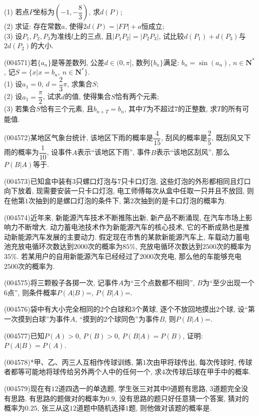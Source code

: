 (1) 若点$P$坐标为$(-1,-\dfrac 83)$, 求$d(P)$;\\
(2) 求证: 存在常数$a$, 使得$2d(P)=|FP|+a$恒成立;\\
(3) 设$P_1,P_2,P_3$为准线$l$上的三点, 且$|P_1P_2|=|P_2P_3|$, 试比较$d(P_1)+d(P_3)$与$2d(P_2)$的大小.
\item (004571)若$\{a_n\}$是等差数列, 公差$d\in (0,\pi]$, 数列$\{b_n\}$满足: $b_n=\sin (a_n)$, $n \in \mathbf{N}^*$, 记$S=\{x|x=b_n, \ n\in \mathbf{N}^*\}$.\\
(1) 设$a_1=0$, $d=\dfrac 23 \pi$, 求集合$S$;\\
(2) 设$a_1=\dfrac\pi 2$, 试求$d$的值, 使得集合$S$恰有两个元素;\\
(3) 若集合$S$恰有三个元素, 且$b_{n+T}=b_n$, 其中$T$为不超过$7$的正整数, 求$T$的所有可能值.
\item (004572)某地区气象台统计, 该地区下雨的概率是$\dfrac 4{15}$, 刮风的概率是$\dfrac 25$, 既刮风又下雨的概率为$\dfrac 1{10}$, 设事件$A$表示``该地区下雨'', 事件$B$表示``该地区刮风'', 那么$P(B|A)$等于.
\item (004573)已知盒中装有$3$只螺口灯泡与$7$只卡口灯泡, 这些灯泡的外形都相同且灯口向下放着, 现需要安装一只卡口灯泡, 电工师傅每次从盒中任取一只并且不放回, 则在他第$1$次抽到的是螺口灯泡的条件下, 第$2$次抽到的是卡口灯泡的概率为.
\item (004574)近年来, 新能源汽车技术不断推陈出新, 新产品不断涌现, 在汽车市场上影响力不断增大. 动力蓄电池技术作为新能源汽车的核心技术, 它的不断成熟也是推动新能源汽车发展的主要动力. 假定现在市售的某款新能源汽车上, 车载动力蓄电池充放电循环次数达到$2000$次的概率为$85\%$, 充放电循环次数达到$2500$次的概率为$35\%$. 若某用户的自用新能源汽车已经经过了$2000$次充电, 那么他的车能够充电$2500$次的概率为.
\item (004575)将三颗骰子各掷一次, 记事件$A$为``三个点数都不相同'', $B$为``至少出现一个$6$点'', 则条件概率$P(A|B)$=, $P(B|A)$=.
\item (004576)袋中有大小完全相同的$2$个白球和$3$个黄球, 逐个不放回地摸出$2$个球, 设``第一次摸到白球''为事件$A$, ``摸到的$2$个球同色''为事件$B$, 则$P(B|A)$=.
\item (004577)已知$P(A)>0$, $P(B)>0$, $P(B|A)=P(B)$, 证明: $P(A|B)=P(A)$.
\item (004578)*甲、乙、丙三人互相作传球训练, 第$1$次由甲将球传出, 每次传球时, 传球者都等可能地将球传给另外两个人中的任何一个, 求$4$次传球后球在甲手中的概率.
\item (004579)现在有$12$道四选一的单选题, 学生张三对其中$9$道题有思路, $3$道题完全没有思路. 有思路的题做对的概率为$0.9$, 没有思路的题只好任意猜一个答案, 猜对的概率为$0.25$, 张三从这$12$道题中随机选择$1$题, 则他做对该题的概率是.
